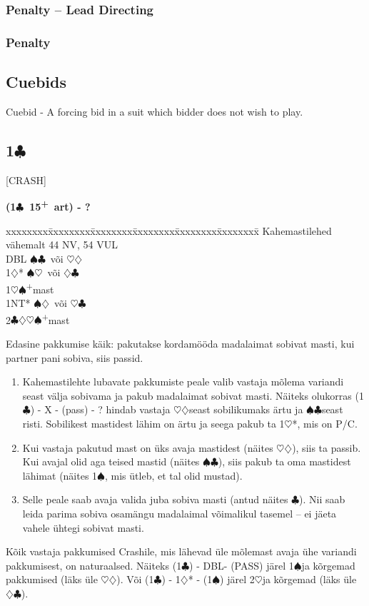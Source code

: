 \documentclass[10pt]{article}
\renewcommand{\c}{$\clubsuit$}
\renewcommand{\d}{$\diamondsuit$}
\newcommand{\h}{$\heartsuit$}
\newcommand{\s}{$\spadesuit$}
\newcommand{\p}{\textsuperscript{+}}
\newcommand{\x}{DBL}
\newenvironment{bidtable}[1][]
{\textbf{#1}
  \begin{adjustwidth}{1em}{}
    \addvspace{2pt}
    \begin{tabbing}
      xxxxxxxx\=xxxxxxxx\=xxxxxxxx\=xxxxxxxx\=xxxxxxxx\=xxxxxxxx\=\kill}
{\end{tabbing}\end{adjustwidth}\bigskip}%
\newcommand{\pdfc}{\texorpdfstring{\c{}}{C}}
\begin{document}
\begin{multicols*}{2}
\subsubsection{Penalty -- Lead Directing}

\subsubsection{Penalty}




\subsection{Cuebids}
Cuebid - A forcing bid in a suit which bidder does not wish to play.

\subsection{1\pdfc}

[CRASH]

\begin{bidtable}[(1\c\ 15\p\ art) - ?]
Kahemastilehed vähemalt 44 NV, 54 VUL \\
\x        \> \s\c\ või \h\d\          \\
1\d*      \> \s\h\ või \d\c           \\
1\h\s     {}\p mast                 \\
1NT*      \> \s\d\ või \h\c\          \\
2\c\d\h\s {}\p mast
\end{bidtable}

Edasine pakkumise käik: pakutakse kordamööda madalaimat sobivat masti, kui partner pani sobiva, siis passid.
\begin{enumerate}
\item Kahemastilehte lubavate pakkumiste peale valib vastaja mõlema variandi seast välja sobivama ja pakub madalaimat sobivat masti. Näiteks olukorras (1\c) - X - (pass) - ? hindab vastaja \h\d seast sobilikumaks ärtu ja \s\c seast risti. Sobilikest mastidest lähim on ärtu ja seega pakub ta 1\h*, mis on P/C.
\item  Kui vastaja pakutud mast on üks avaja mastidest (näites \h\d), siis ta passib. Kui avajal olid aga teised mastid (näites \s\c), siis pakub ta oma mastidest lähimat (näites 1\s, mis ütleb, et tal olid mustad).
\item  Selle peale saab avaja valida juba sobiva masti (antud näites \c). Nii saab leida parima sobiva osamängu madalaimal võimalikul tasemel – ei jäeta vahele ühtegi sobivat masti.
\end{enumerate}
Kõik vastaja pakkumised Crashile, mis lähevad üle mõlemast avaja ühe variandi pakkumisest, on naturaalsed. Näiteks (1\c) - \x - (PASS) järel 1\s ja kõrgemad pakkumised (läks üle \h\d). Või (1\c) - 1\d* - (1\s) järel 2\h ja kõrgemad (läks üle \d\c).


\end{multicols*}
\end{document}
